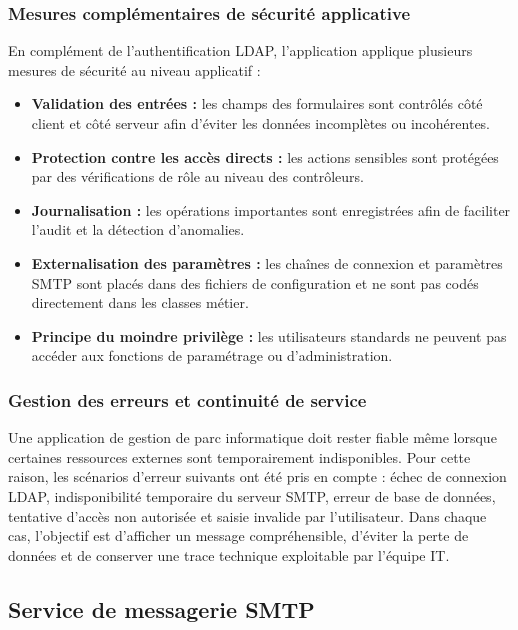 \subsubsection{Mesures complémentaires de sécurité applicative}

En complément de l'authentification LDAP, l'application applique plusieurs mesures de sécurité au niveau applicatif :

\begin{itemize}[label=\textbullet,font=\normalsize]
    \item \textbf{Validation des entrées :} les champs des formulaires sont contrôlés côté client et côté serveur afin d'éviter les données incomplètes ou incohérentes.
    \item \textbf{Protection contre les accès directs :} les actions sensibles sont protégées par des vérifications de rôle au niveau des contrôleurs.
    \item \textbf{Journalisation :} les opérations importantes sont enregistrées afin de faciliter l'audit et la détection d'anomalies.
    \item \textbf{Externalisation des paramètres :} les chaînes de connexion et paramètres SMTP sont placés dans des fichiers de configuration et ne sont pas codés directement dans les classes métier.
    \item \textbf{Principe du moindre privilège :} les utilisateurs standards ne peuvent pas accéder aux fonctions de paramétrage ou d'administration.
\end{itemize}

\subsubsection{Gestion des erreurs et continuité de service}

Une application de gestion de parc informatique doit rester fiable même lorsque certaines ressources externes sont temporairement indisponibles. Pour cette raison, les scénarios d'erreur suivants ont été pris en compte : échec de connexion LDAP, indisponibilité temporaire du serveur SMTP, erreur de base de données, tentative d'accès non autorisée et saisie invalide par l'utilisateur. Dans chaque cas, l'objectif est d'afficher un message compréhensible, d'éviter la perte de données et de conserver une trace technique exploitable par l'équipe IT.

\subsection{Service de messagerie SMTP}

